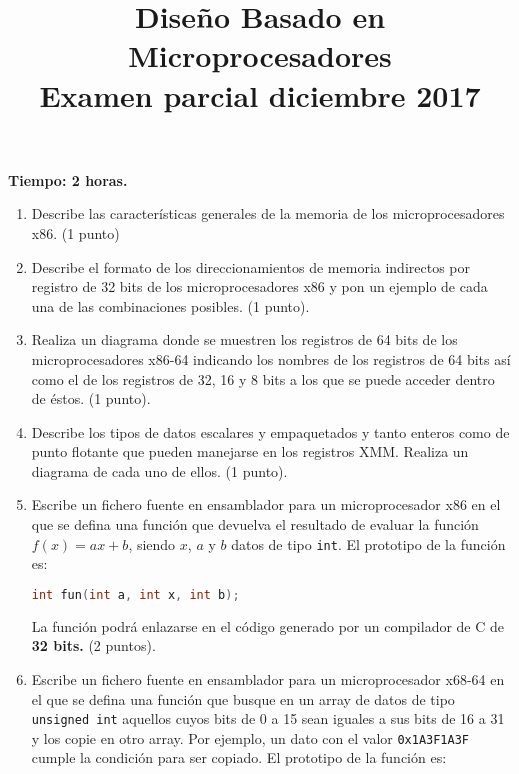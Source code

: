 \documentclass[12pt,letterpaper]{article}
\title{Diseño Basado en Microprocesadores\\Examen parcial diciembre 2017}
\date{ }
\begin{document}
	
	\maketitle
		
	
	
	
	\lstset{language=bash, numbers=left, numberstyle=\tiny, numbersep=10pt, firstnumber=1, stepnumber=1, basicstyle=\small\ttfamily, tabsize=1, extendedchars=true, inputencoding=latin1}

\textbf{Tiempo: 2 horas.}
\begin{enumerate}
	\item Describe las características generales de la memoria de los microprocesadores x86. (1 punto)\\
	\item Describe el formato de los direccionamientos de memoria indirectos por registro de 32 bits de los microprocesadores x86 y pon un ejemplo de cada una de las combinaciones posibles. (1 punto).\\
	\item Realiza un diagrama donde se muestren los registros de 64 bits de los microprocesadores x86-64 indicando los nombres de los registros de 64 bits así como el de los registros de 32, 16 y 8 bits a los que se puede acceder dentro de éstos. (1 punto).\\
	\item Describe los tipos de datos escalares y empaquetados y tanto enteros como de punto flotante que pueden manejarse en los registros XMM. Realiza un diagrama de cada uno de ellos. (1 punto).\\
	\item Escribe un fichero fuente en ensamblador para un microprocesador x86 en el que se defina una función que devuelva el resultado de evaluar la función $f(x)=ax+b$, siendo $x$, $a$ y $b$ datos de tipo \texttt{int}. El prototipo de la función es:
	\begin{lstlisting}[language=C]
		int fun(int a, int x, int b);
	\end{lstlisting}
	La función podrá enlazarse en el código generado por un compilador de C de \textbf{32 bits.} (2 puntos).\\
	\item Escribe un fichero fuente en ensamblador para un microprocesador x68-64 en el que se defina una función que busque en un array de datos de tipo \texttt{unsigned int} aquellos cuyos bits de 0 a 15 sean iguales a sus bits de 16 a 31 y los copie en otro array. Por ejemplo, un dato con el valor \texttt{0x1A3F1A3F} cumple la condición para ser copiado. El prototipo de la función es:

\end{enumerate}
\end{document}
